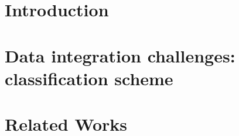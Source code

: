 \documentclass{llncs}
\begin{document}
%



\section{Introduction}
\label{sec:intro}
 
 
\section{Data integration challenges: classification scheme}\label{sec:sm}



\section{Related Works}\label{sec:rw}


\end{document}
